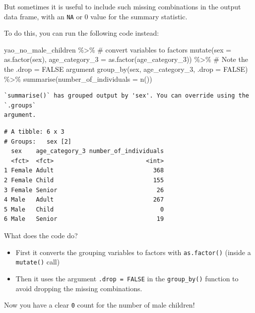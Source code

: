 \documentclass[
  letterpaper,
  DIV=11,
  numbers=noendperiod]{scrreprt}
\newenvironment{Shaded}{\begin{snugshade}}{\end{snugshade}}
\newcommand{\AttributeTok}[1]{\textcolor[rgb]{0.40,0.45,0.13}{#1}}
\newcommand{\CommentTok}[1]{\textcolor[rgb]{0.37,0.37,0.37}{#1}}
\newcommand{\ConstantTok}[1]{\textcolor[rgb]{0.56,0.35,0.01}{#1}}
\newcommand{\FunctionTok}[1]{\textcolor[rgb]{0.28,0.35,0.67}{#1}}
\newcommand{\NormalTok}[1]{\textcolor[rgb]{0.00,0.23,0.31}{#1}}
\newcommand{\SpecialCharTok}[1]{\textcolor[rgb]{0.37,0.37,0.37}{#1}}
\begin{document}
But sometimes it is useful to include such missing combinations in the
output data frame, with an \texttt{NA} or 0 value for the summary
statistic.

To do this, you can run the following code instead:

\begin{Shaded}
\begin{Highlighting}[]
\NormalTok{yao\_no\_male\_children }\SpecialCharTok{\%\textgreater{}\%} 
  \CommentTok{\# convert variables to factors}
  \FunctionTok{mutate}\NormalTok{(}\AttributeTok{sex =} \FunctionTok{as.factor}\NormalTok{(sex), }
         \AttributeTok{age\_category\_3 =} \FunctionTok{as.factor}\NormalTok{(age\_category\_3)) }\SpecialCharTok{\%\textgreater{}\%} 
  \CommentTok{\# Note the the .drop = FALSE argument}
  \FunctionTok{group\_by}\NormalTok{(sex, age\_category\_3, }\AttributeTok{.drop =} \ConstantTok{FALSE}\NormalTok{) }\SpecialCharTok{\%\textgreater{}\%} 
  \FunctionTok{summarise}\NormalTok{(}\AttributeTok{number\_of\_individuals =} \FunctionTok{n}\NormalTok{())}
\end{Highlighting}
\end{Shaded}

\begin{verbatim}
`summarise()` has grouped output by 'sex'. You can override using the `.groups`
argument.
\end{verbatim}

\begin{verbatim}
# A tibble: 6 x 3
# Groups:   sex [2]
  sex    age_category_3 number_of_individuals
  <fct>  <fct>                          <int>
1 Female Adult                            368
2 Female Child                            155
3 Female Senior                            26
4 Male   Adult                            267
5 Male   Child                              0
6 Male   Senior                            19
\end{verbatim}

What does the code do?

\begin{itemize}
\item
  First it converts the grouping variables to factors with
  \texttt{as.factor()} (inside a \texttt{mutate()} call)
\item
  Then it uses the argument \texttt{.drop\ =\ FALSE} in the
  \texttt{group\_by()} function to avoid dropping the missing
  combinations.
\end{itemize}

Now you have a clear \texttt{0} count for the number of male children!
\end{document}
